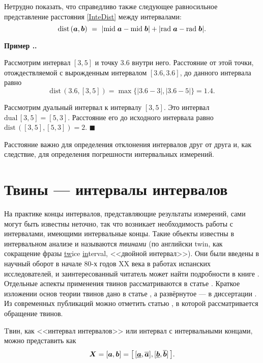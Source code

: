 \documentclass[a5paper,openany]{book}
\newcommand{\mbf}[1]{\protect\text{\boldmath$#1$}}
\newcommand{\ov}{\overline}
\newcommand{\un}{\underline}
\newcommand{\m}{\mathrm{mid}\;}
\newcommand{\dual}{\mathrm{dual}\,}
\newcommand{\dist}{\mathrm{dist}\,}
\renewcommand{\r}{\mathrm{rad}\;}
\newcounter{ExmpNum}[section]
\renewcommand{\theExmpNum}{\thesection.\arabic{ExmpNum}}
\newenvironment{example}%
  {\refstepcounter{ExmpNum}%
  \par\addvspace{\medskipamount} 
  \noindent\textbf{Пример {\theExmpNum}.}
  }%
  {\hfill$\blacksquare$\par\medskip}
\begin{document}
Нетрудно показать, что справедливо также следующее равносильное представление 
расстояния \eqref{InteDist} между интервалами: 
\begin{equation*}
\dist(\mbf{a}, \mbf{b}) \  = \  |\m\mbf{a} - \m\mbf{b}| + |\r\mbf{a} - \r\mbf{b}|.
\end{equation*}
  
\begin{example}
Рассмотрим интервал $[3, 5]$ и точку $3.6$ внутри него. Расстояние от этой точки,  
отождествляемой с вырожденным интервалом $[3.6, 3.6]$, до данного интервала равно 
\begin{equation*} 
\dist(3.6, [3, 5]) = \max\bigl\{|3.6 - 3|, |3.6 - 5|\bigr\} = 1.4. 
\end{equation*} 
  
Рассмотрим дуальный интервал к интервалу $[3, 5]$. Это интервал $\dual[3, 5] = [5, 3]$.  
Расстояние его до исходного интервала равно $\dist([3, 5], [5, 3]) = 2$. 
\end{example}
  
Расстояние важно для определения отклонения интервалов друг от друга и, как следствие, 
для определения погрешности интервальных измерений. 
  
  
\section{Твины --- интервалы интервалов} 

На практике концы интервалов, представляющие результаты измерений, сами могут быть 
известны неточно, так что возникает необходимость работы с интервалами, имеющими  
интервальные концы. Такие объекты известны в интервальном анализе и называются 
\textit{твинами} (по английски twin, как сокращение фразы \un{tw}ice \un{in}terval, 
<<двойной интервал>>). Они были введены в научный оборот в начале 
80-х годов XX века в работах испанских исследователей, и заинтересованный читатель 
может найти подробности в книге \cite{ModalIABook}. Отдельные аспекты применения 
твинов рассматриваются в статье \cite{Twins1981}. Краткое изложении основ теории 
твинов дано в статье \cite{Nesterov1997}, а развёрнутое --- в диссертации 
\cite{Nesterov1999}. 
Из современных публикаций можно отметить статью \cite{ThickSet}, в которой рассматривается обращение твинов.

  
Tвин, как <<интервал интервалов>>  или интервал с интервальными концами, можно 
представить как 
\begin{equation} 
\label{Twin}
\mbf{X} = 
[\mbf{a}, \mbf{b}] = \bigl[\,[\un{\mbf{a}}, \ov{\mbf{a}}], [\un{\mbf{b}}, \ov{\mbf{b}}]\,\bigr].
\end{equation}
\end{document}
